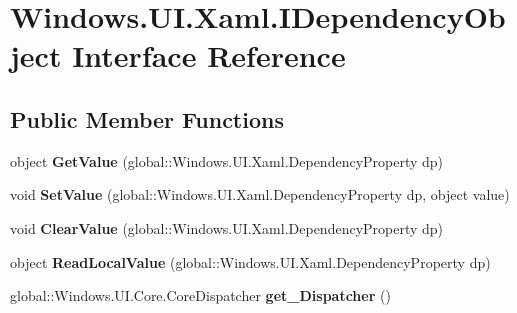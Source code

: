 \hypertarget{interface_windows_1_1_u_i_1_1_xaml_1_1_i_dependency_object}{}\section{Windows.\+U\+I.\+Xaml.\+I\+Dependency\+Object Interface Reference}
\label{interface_windows_1_1_u_i_1_1_xaml_1_1_i_dependency_object}
\subsection*{Public Member Functions}
\begin{DoxyCompactItemize}
\item 
\mbox{\label{interface_windows_1_1_u_i_1_1_xaml_1_1_i_dependency_object_a1744dc503c3fc269bb45b8db06275e99}} 
object {\bfseries Get\+Value} (global\+::\+Windows.\+U\+I.\+Xaml.\+Dependency\+Property dp)
\item 
\mbox{\label{interface_windows_1_1_u_i_1_1_xaml_1_1_i_dependency_object_a7174b4128f6df875a6cd6f3b979105da}} 
void {\bfseries Set\+Value} (global\+::\+Windows.\+U\+I.\+Xaml.\+Dependency\+Property dp, object value)
\item 
\mbox{\label{interface_windows_1_1_u_i_1_1_xaml_1_1_i_dependency_object_a1169e582ab655b744276f5fc85131e33}} 
void {\bfseries Clear\+Value} (global\+::\+Windows.\+U\+I.\+Xaml.\+Dependency\+Property dp)
\item 
\mbox{\label{interface_windows_1_1_u_i_1_1_xaml_1_1_i_dependency_object_ac164cdf8cd074ee7873c1b78067c67a9}} 
object {\bfseries Read\+Local\+Value} (global\+::\+Windows.\+U\+I.\+Xaml.\+Dependency\+Property dp)
\item 
\mbox{\label{interface_windows_1_1_u_i_1_1_xaml_1_1_i_dependency_object_ab52f7609e07a50a387cb3677a4d0304f}} 
global\+::\+Windows.\+U\+I.\+Core.\+Core\+Dispatcher {\bfseries get\+\_\+\+Dispatcher} ()
\item 
\mbox{\label{interface_windows_1_1_u_i_1_1_xaml_1_1_i_dependency_object_a1744dc503c3fc269bb45b8db06275e99}} 

\end{DoxyCompactItemize}
